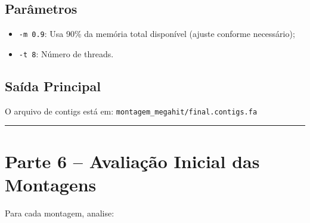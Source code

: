\documentclass[
  brazilian,
  letterpaper,
  DIV=11,
  numbers=noendperiod]{scrartcl}
\newenvironment{Shaded}{\begin{snugshade}}{\end{snugshade}}
\newcommand{\AttributeTok}[1]{\textcolor[rgb]{0.40,0.45,0.13}{#1}}
\newcommand{\CommentTok}[1]{\textcolor[rgb]{0.37,0.37,0.37}{#1}}
\newcommand{\FunctionTok}[1]{\textcolor[rgb]{0.28,0.35,0.67}{#1}}
\newcommand{\KeywordTok}[1]{\textcolor[rgb]{0.00,0.23,0.31}{\textbf{#1}}}
\newcommand{\NormalTok}[1]{\textcolor[rgb]{0.00,0.23,0.31}{#1}}
\newcommand{\StringTok}[1]{\textcolor[rgb]{0.13,0.47,0.30}{#1}}
\providecommand{\tightlist}{%
  \setlength{\itemsep}{0pt}\setlength{\parskip}{0pt}}
\begin{document}
\subsection{Parâmetros}\label{paruxe2metros}

\begin{itemize}
\tightlist
\item
  \texttt{-m\ 0.9}: Usa 90\% da memória total disponível (ajuste
  conforme necessário);
\item
  \texttt{-t\ 8}: Número de threads.
\end{itemize}

\subsection{Saída Principal}\label{sauxedda-principal-2}

O arquivo de contigs está em:
\texttt{montagem\_megahit/final.contigs.fa}

\begin{center}\rule{0.5\linewidth}{0.5pt}\end{center}

\section{Parte 6 -- Avaliação Inicial das
Montagens}\label{parte-6-avaliauxe7uxe3o-inicial-das-montagens}

Para cada montagem, analise:

\begin{Shaded}
\end{Shaded}
\end{document}
